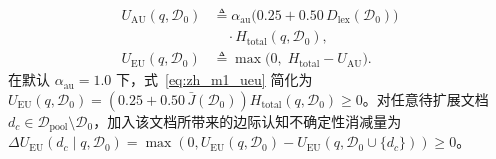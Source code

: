 \documentclass[11pt]{article}
\begin{document}
\begin{align}
U_{\text{AU}}(q, \mathcal{D}_0) &\triangleq \alpha_{\text{au}}\bigl(0.25 + 0.50 \, D_{\text{lex}}(\mathcal{D}_0)\bigr) \nonumber \\
&\quad \cdot H_{\text{total}}(q, \mathcal{D}_0), \label{eq:zh_m1_uau} \\
U_{\text{EU}}(q, \mathcal{D}_0) &\triangleq \max\bigl(0, \; H_{\text{total}} - U_{\text{AU}}\bigr). \label{eq:zh_m1_ueu}
\end{align}
在默认 $\alpha_{\text{au}} = 1.0$ 下，式~\eqref{eq:zh_m1_ueu} 简化为 $U_{\text{EU}}(q, \mathcal{D}_0) = (0.25 + 0.50 \, \bar{J}(\mathcal{D}_0)) H_{\text{total}}(q, \mathcal{D}_0) \ge 0$。对任意待扩展文档 $d_c \in \mathcal{D}_{\text{pool}} \setminus \mathcal{D}_0$，加入该文档所带来的边际认知不确定性消减量为 $\Delta U_{\text{EU}}(d_c \mid q, \mathcal{D}_0) = \max(0, U_{\text{EU}}(q, \mathcal{D}_0) - U_{\text{EU}}(q, \mathcal{D}_0 \cup \{d_c\})) \ge 0$。
\end{document}
